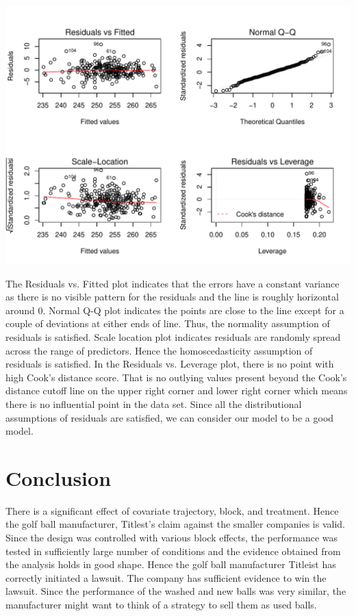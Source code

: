 \documentclass{article}\usepackage[]{graphicx}\usepackage[]{color}
\makeatletter
\def\maxwidth{ %
  \ifdim\Gin@nat@width>\linewidth
    \linewidth
  \else
    \Gin@nat@width
  \fi
}
\newenvironment{knitrout}{}{} %
\makeatother
\begin{document}
\begin{knitrout}
\color{fgcolor}
\includegraphics[width=\maxwidth]{figure/diagnostics-1} 

\end{knitrout}
The Residuals vs. Fitted plot indicates that the errors have a constant variance as there is no visible pattern for the residuals and the line is roughly horizontal around 0. Normal Q-Q plot indicates the points are close to the line except for a couple of deviations at either ends of line. Thus, the normality assumption of residuals is satisfied. Scale location plot indicates residuals are randomly spread across the range of predictors. Hence the homoscedasticity assumption of residuals is satisfied. In the Residuals vs. Leverage plot, there is no point with high Cook's distance score. That is no outlying values present beyond the Cook's distance cutoff line on the upper right corner and lower right corner which means there is no influential point in the data set. Since all the distributional assumptions of residuals are satisfied, we can consider our model to be a good model.
\section*{Conclusion}
There is a significant effect of covariate trajectory, block, and treatment. Hence the golf ball manufacturer, Titlest's claim against the smaller companies is valid. Since the design was controlled with various block effects, the performance was tested in sufficiently large number of conditions and the evidence obtained from the analysis holds in good shape. Hence the golf ball manufacturer Titleist has correctly initiated a lawsuit. The company has sufficient evidence to win the lawsuit. Since the performance of the washed and new balls was very similar, the manufacturer might want to think of a strategy to sell them as used balls. 
\end{document}
